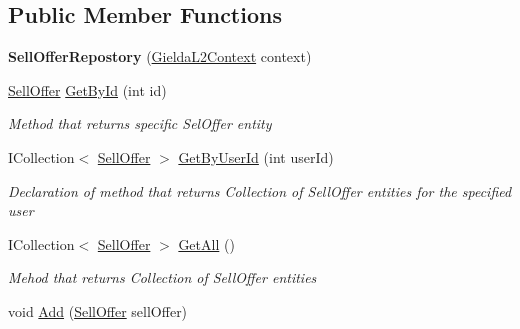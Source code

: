 \subsection*{Public Member Functions}
\begin{DoxyCompactItemize}
\item 
\mbox{\label{class_gielda_l2_1_1_i_n_f_r_a_s_t_r_u_c_t_u_r_e_1_1_repositories_1_1_sell_offer_repostory_a01dce17dd39b709fafdcc2cd2d586fa6}} 
{\bfseries Sell\+Offer\+Repostory} (\mbox{\hyperlink{class_gielda_l2_1_1_d_b_1_1_gielda_l2_context}{Gielda\+L2\+Context}} context)
\item 
\mbox{\hyperlink{class_gielda_l2_1_1_d_b_1_1_entities_1_1_sell_offer}{Sell\+Offer}} \mbox{\hyperlink{class_gielda_l2_1_1_i_n_f_r_a_s_t_r_u_c_t_u_r_e_1_1_repositories_1_1_sell_offer_repostory_a66ee116572e1e4c959b50d3ad1c4698d}{Get\+By\+Id}} (int id)
\begin{DoxyCompactList}\small\item\em Method that returns specific Sel\+Offer entity \end{DoxyCompactList}\item 
I\+Collection$<$ \mbox{\hyperlink{class_gielda_l2_1_1_d_b_1_1_entities_1_1_sell_offer}{Sell\+Offer}} $>$ \mbox{\hyperlink{class_gielda_l2_1_1_i_n_f_r_a_s_t_r_u_c_t_u_r_e_1_1_repositories_1_1_sell_offer_repostory_aa00ce3d22fa6d090a5e40103fb202724}{Get\+By\+User\+Id}} (int user\+Id)
\begin{DoxyCompactList}\small\item\em Declaration of method that returns Collection of Sell\+Offer entities for the specified user \end{DoxyCompactList}\item 
I\+Collection$<$ \mbox{\hyperlink{class_gielda_l2_1_1_d_b_1_1_entities_1_1_sell_offer}{Sell\+Offer}} $>$ \mbox{\hyperlink{class_gielda_l2_1_1_i_n_f_r_a_s_t_r_u_c_t_u_r_e_1_1_repositories_1_1_sell_offer_repostory_a1dbfc870dcfaa42e29a440635c7b30d1}{Get\+All}} ()
\begin{DoxyCompactList}\small\item\em Mehod that returns Collection of Sell\+Offer entities \end{DoxyCompactList}\item 
void \mbox{\hyperlink{class_gielda_l2_1_1_i_n_f_r_a_s_t_r_u_c_t_u_r_e_1_1_repositories_1_1_sell_offer_repostory_a9998a9883c5ae73fb854eeff44075e73}{Add}} (\mbox{\hyperlink{class_gielda_l2_1_1_d_b_1_1_entities_1_1_sell_offer}{Sell\+Offer}} sell\+Offer)

\end{DoxyCompactItemize}
